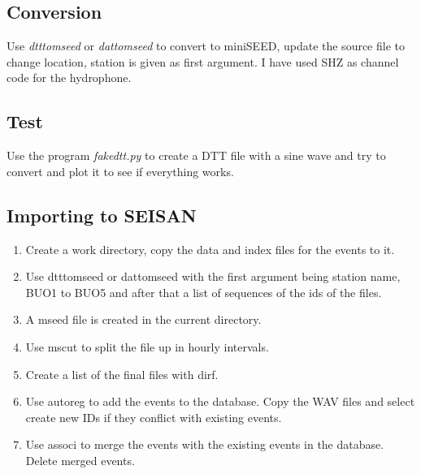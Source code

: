 \documentclass[a4paper]{article}
\begin{document}
\begin{multicols}{2}
    \subsection{Conversion}
    Use \textit{dtttomseed} or \textit{dattomseed} to convert to miniSEED, update the source
    file to change location, station is given as first argument. I have used SHZ as channel code
    for the hydrophone.

    \subsection{Test}
    Use the program \textit{fakedtt.py} to create a DTT file with a sine
    wave and try to convert and plot it to see if everything works.

    \subsection{Importing to SEISAN}
      \begin{enumerate}
        \item Create a work directory, copy the data and index files for
          the events to it.
        \item Use dtttomseed or dattomseed with the first argument being
          station name, BUO1 to BUO5 and after that a list of sequences
          of the ids of the files.
        \item A mseed file is created in the current directory.
        \item Use mscut to split the file up in hourly intervals.
        \item Create a list of the final files with dirf.
        \item Use autoreg to add the events to the database. Copy the
          WAV files and select create new IDs if they conflict with
          existing events.
        \item Use associ to merge the events with the existing events in
          the database. Delete merged events.
      \end{enumerate}


\end{multicols}
\end{document}
